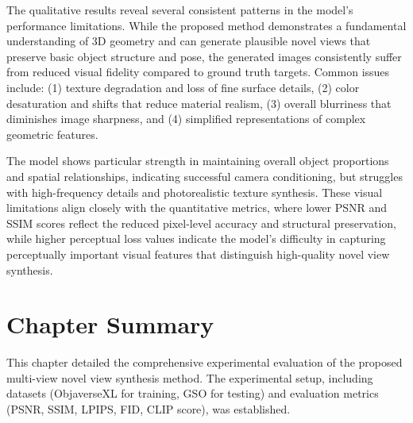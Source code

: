 \newpage
The qualitative results reveal several consistent patterns in the model's performance limitations. While the proposed method demonstrates a fundamental understanding of 3D geometry and can generate plausible novel views that preserve basic object structure and pose, the generated images consistently suffer from reduced visual fidelity compared to ground truth targets. Common issues include: (1) texture degradation and loss of fine surface details, (2) color desaturation and shifts that reduce material realism, (3) overall blurriness that diminishes image sharpness, and (4) simplified representations of complex geometric features.

The model shows particular strength in maintaining overall object proportions and spatial relationships, indicating successful camera conditioning, but struggles with high-frequency details and photorealistic texture synthesis. These visual limitations align closely with the quantitative metrics, where lower PSNR and SSIM scores reflect the reduced pixel-level accuracy and structural preservation, while higher perceptual loss values indicate the model's difficulty in capturing perceptually important visual features that distinguish high-quality novel view synthesis.

\section{Chapter Summary}\label{sec:exp_summary}
This chapter detailed the comprehensive experimental evaluation of the proposed multi-view novel view synthesis method. The experimental setup, including datasets (ObjaverseXL for training, GSO for testing) and evaluation metrics (PSNR, SSIM, LPIPS, FID, CLIP score), was established.

